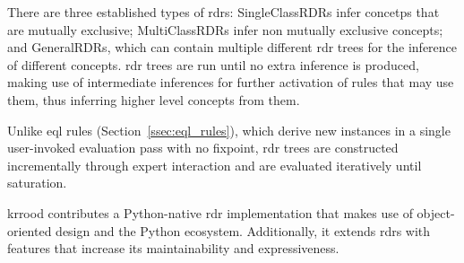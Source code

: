 \documentclass{article}
\begin{document}
There are three established types of \ac{rdr}s: SingleClassRDRs infer concetps that are mutually exclusive; MultiClassRDRs infer non mutually exclusive concepts; and GeneralRDRs, which can contain multiple different \ac{rdr} trees for the inference of different concepts. \ac{rdr} trees are run until no extra inference is produced, making use of intermediate inferences for further activation of rules that may use them, thus inferring higher level concepts from them.

Unlike \ac{eql} rules (Section~\ref{ssec:eql_rules}), which derive new
instances in a single user-invoked evaluation pass with no fixpoint, \ac{rdr}
trees are constructed incrementally through expert interaction and are
evaluated iteratively until saturation.

\ac{krrood} contributes a Python-native \ac{rdr} implementation that makes use of object-oriented design and the Python ecosystem. Additionally, it extends \acp{rdr} with features that increase its maintainability and expressiveness.
\end{document}
